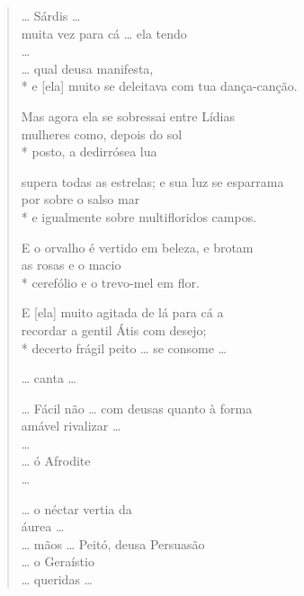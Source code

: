 \begin{verse}
\ldots{} Sárdis \ldots{}\\
muita vez para cá \ldots{} ela tendo\\
\ldots{}\\
\ldots{} qual deusa manifesta,\\*
e [ela] muito se deleitava com tua dança-canção.

Mas agora ela se sobressai entre Lídias\\
mulheres como, depois do sol\\*
posto, a dedirrósea lua

supera todas as estrelas; e sua luz se esparrama\\
por sobre o salso mar \\*
e igualmente sobre multifloridos campos.

E o orvalho é vertido em beleza, e brotam\\
as rosas e o macio \\*
cerefólio e o trevo-mel em flor.

E [ela] muito agitada de lá para cá a \\
recordar a gentil Átis com desejo;\\*
decerto frágil peito \ldots{} se consome \ldots{}

\ldots{} canta \ldots{}

\ldots{} Fácil não \ldots{} com deusas quanto à forma\\
amável rivalizar \ldots{}\\
\ldots{}\\
\ldots{} ó Afrodite\\
\ldots{}

\ldots{} o néctar vertia da\\
áurea \ldots{}\\
\ldots{} mãos \ldots{} Peitó, deusa Persuasão\\
\ldots{} o Geraístio\\
\ldots{} queridas \ldots{}
\end{verse}

\medskip

